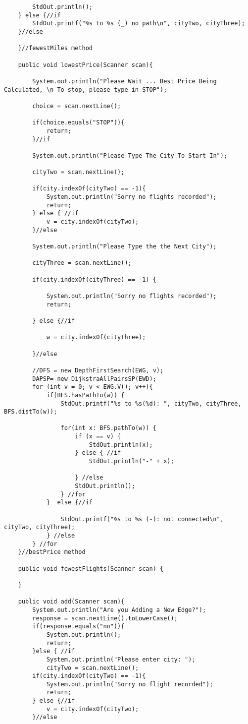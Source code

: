 \documentclass{article}
\begin{document}
\begin{lstlisting}
		StdOut.println();
	} else {//if
		StdOut.printf("%s to %s (_) no path\n", cityTwo, cityThree);
	}//else

	}//fewestMiles method

	public void lowestPrice(Scanner scan){

		System.out.println("Please Wait ... Best Price Being Calculated, \n To stop, please type in STOP");
		
		choice = scan.nextLine();

		if(choice.equals("STOP")){
			return;
		}//if

		System.out.println("Please Type The City To Start In");

		cityTwo = scan.nextLine();

		if(city.indexOf(cityTwo) == -1){
			System.out.println("Sorry no flights recorded");
			return;
		} else { //if
			v = city.indexOf(cityTwo);
		}//else

		System.out.println("Please Type the the Next City");

		cityThree = scan.nextLine();

		if(city.indexOf(cityThree) == -1) {

			System.out.println("Sorry no flights recorded");
			return;

		} else {//if

			w = city.indexOf(cityThree);

		}//else

		//DFS = new DepthFirstSearch(EWG, v);
		DAPSP= new DijkstraAllPairsSP(EWD);
		for (int v = 0; v < EWG.V(); v++){
			if(BFS.hasPathTo(w)) {
				StdOut.printf("%s to %s(%d): ", cityTwo, cityThree, BFS.distTo(w));

				for(int x: BFS.pathTo(w)) {
					if (x == v) {
						StdOut.println(x);
					} else { //if
						StdOut.println("-" + x);

					} //else
					StdOut.println();
				} //for
			}  else {//if

				StdOut.printf("%s to %s (-): not connected\n", cityTwo, cityThree);
			} //else
		} //for
	}//bestPrice method

	public void fewestFlights(Scanner scan) {

	}

	public void add(Scanner scan){
		System.out.println("Are you Adding a New Edge?");
		response = scan.nextLine().toLowerCase();
		if(response.equals("no")){
			System.out.println();
			return;
		}else { //if
			System.out.println("Please enter city: ");
			cityTwo = scan.nextLine();
		if(city.indexOf(cityTwo) == -1){
			System.out.println("Sorry no flight recorded");
			return;
		} else {//if
			v = city.indexOf(cityTwo);
		}//else


\end{lstlisting}
\end{document}
